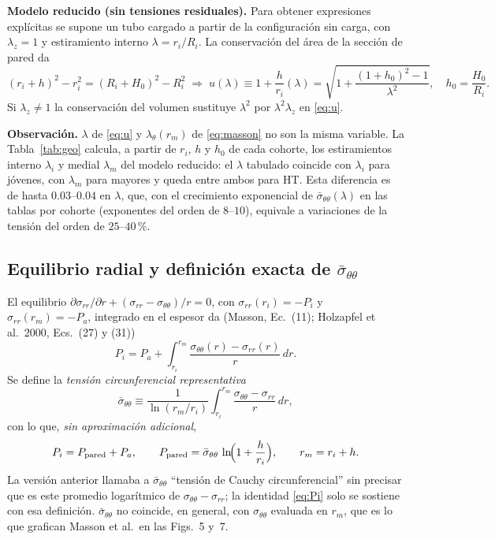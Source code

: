 \documentclass[11pt]{article}
\newcommand{\sbar}{\bar\sigma_{\theta\theta}}
\begin{document}
\textbf{Modelo reducido (sin tensiones residuales).} Para obtener expresiones explícitas se supone un tubo cargado a partir de la configuración sin carga, con $\lambda_z=1$ y estiramiento interno $\lambda=r_i/R_i$. La conservación del área de la sección de pared da
\begin{equation}
(r_i+h)^2-r_i^2=(R_i+H_0)^2-R_i^2\;\Longrightarrow\;
u(\lambda)\equiv1+\frac{h}{r_i}(\lambda)=\sqrt{1+\frac{(1+h_0)^2-1}{\lambda^{2}}},\quad h_0=\frac{H_0}{R_i}.
\label{eq:u}
\end{equation}
Si $\lambda_z\neq1$ la conservación del volumen sustituye $\lambda^2$ por $\lambda^2\lambda_z$ en \eqref{eq:u}.

\textbf{Observación.} $\lambda$ de \eqref{eq:u} y $\lambda_\theta(r_m)$ de \eqref{eq:masson} no son la misma variable. La Tabla~\ref{tab:geo} calcula, a partir de $r_i$, $h$ y $h_0$ de cada cohorte, los estiramientos interno $\lambda_i$ y medial $\lambda_m$ del modelo reducido: el $\lambda$ tabulado coincide con $\lambda_i$ para jóvenes, con $\lambda_m$ para mayores y queda entre ambos para HT. Esta diferencia es de hasta $0.03$--$0.04$ en $\lambda$, que, con el crecimiento exponencial de $\sbar(\lambda)$ en las tablas por cohorte (exponentes del orden de $8$--$10$), equivale a variaciones de la tensión del orden de $25$--$40\,\%$.

\subsection{Equilibrio radial y definición exacta de $\sbar$}
El equilibrio $\partial\sigma_{rr}/\partial r+(\sigma_{rr}-\sigma_{\theta\theta})/r=0$, con $\sigma_{rr}(r_i)=-P_i$ y $\sigma_{rr}(r_m)=-P_a$, integrado en el espesor da (Masson, Ec.~(11); Holzapfel et al.\ 2000, Ecs.~(27) y (31))
\begin{equation}
P_i=P_a+\int_{r_i}^{r_m}\frac{\sigma_{\theta\theta}(r)-\sigma_{rr}(r)}{r}\,dr .
\label{eq:eq}
\end{equation}
Se define la \emph{tensión circunferencial representativa}
\begin{equation}
\sbar\equiv\frac{1}{\ln(r_m/r_i)}\int_{r_i}^{r_m}\frac{\sigma_{\theta\theta}-\sigma_{rr}}{r}\,dr,
\label{eq:sbar}
\end{equation}
con lo que, \emph{sin aproximación adicional},
\begin{equation}
P_i=P_{\rm pared}+P_a,\qquad P_{\rm pared}=\sbar\,\ln\!\Bigl(1+\frac{h}{r_i}\Bigr),\qquad r_m=r_i+h .
\label{eq:Pi}
\end{equation}
La versión anterior llamaba a $\sbar$ ``tensión de Cauchy circunferencial'' sin precisar que es este promedio logarítmico de $\sigma_{\theta\theta}-\sigma_{rr}$; la identidad \eqref{eq:Pi} solo se sostiene con esa definición. $\sbar$ no coincide, en general, con $\sigma_{\theta\theta}$ evaluada en $r_m$, que es lo que grafican Masson et al.\ en las Figs.~5 y~7.
\end{document}
